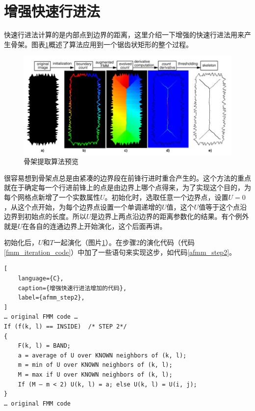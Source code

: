 \section{增强快速行进法}
\label{section-afmm}
快速行进法计算的是内部点到边界的距离，这里介绍一下增强的快速行进法用来产生骨架。图表\ref{skel_overview}概述了算法应用到一个锯齿状矩形的整个过程。
\begin{figure}[h!]
    \centering
    \includegraphics[height=200bp]{figure/skel_overview.png}
    \caption{骨架提取算法预览}
    \label{skel_overview}
\end{figure}
很容易想到骨架点总是由紧凑的边界段在前锋行进时重合产生的。这个方法的重点就在于确定每一个行进前锋上的点是由边界上哪个点得来，为了实现这个目的，为每个网格点新增了一个实数属性$U$。初始化时，选取任意一个边界点，设置$U=0$，从这个点开始，为每个边界点设置一个单调递增的$U$值，这个$U$值等于这个点沿边界到初始点的长度。所以$U$是边界上两点沿边界的距离参数化的结果。有个例外就是$U$在各自的连通边界上开始演化，这个后面再讲。

初始化后，$U$和$T$一起演化（图片\ref{skel_overview}）。在步骤2的演化代码（代码\ref{fmm_iteration_code}）中加了一些语句来实现这步，如代码\ref{afmm_step2}。
\begin{lstlisting}[
    language={C},
    caption={增强快速行进法增加的代码},
    label={afmm_step2},
]
… original FMM code …
If (f(k, l) == INSIDE)	/* STEP 2*/
{
	F(k, l) = BAND;
	a = average of U over KNOWN neighbors of (k, l);
	m = min of U over KNOWN neighbors of (k, l);
	M = max if U over KNOWN neighbors of (k, l);
	If (M – m < 2) U(k, l) = a; else U(k, l) = U(i, j);
}
… original FMM code
\end{lstlisting}

